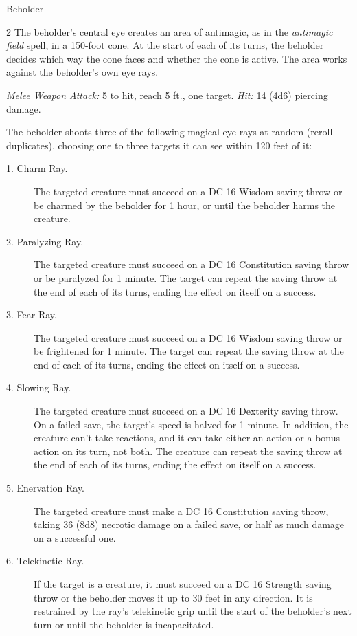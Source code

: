 \documentclass[10pt,a4paper,twoside,bg=print,twocolumn,openany,nodeprecatedcode]{dndbook}
\begin{document}
\begin{DndMonster}[float*=b,width=\textwidth + 8pt]{Beholder}
\begin{multicols}{2}
\DndMonsterBasics[
armor-class = {18 (natural armor)},
hit-points = {\DndDice{19d10 + 76}},
speed = {0 ft., fly 20 ft. \textit{(hover)}}
]
\DndMonsterAbilityScores[
 str = 10,
 dex = 14,
 con = 18,
 int = 17,
 wis = 15,
 cha = 17
]
\DndMonsterDetails[
saving-throws = {Int +8, Wis +7, Cha +8},
skills = {Perception +12},
condition-immunities = {prone},
senses = {darkvision 120 ft., passive perception 22},
languages = {Deep Speech, Undercommon},
challenge = 13,
]
The beholder's central eye creates an area of antimagic, as in the \textit{antimagic field} spell, in a 150-foot cone. At the start of each of its turns, the beholder decides which way the cone faces and whether the cone is active. The area works against the beholder's own eye rays.

\textsl{Melee Weapon Attack:} 5 to hit, reach 5 ft., one target. \textsl{Hit:} 14 (4d6) piercing damage.

The beholder shoots three of the following magical eye rays at random (reroll duplicates), choosing one to three targets it can see within 120 feet of it:


\begin{description}
\item[1. Charm Ray.]
The targeted creature must succeed on a DC 16 Wisdom saving throw or be charmed by the beholder for 1 hour, or until the beholder harms the creature.
\item[2. Paralyzing Ray.]
The targeted creature must succeed on a DC 16 Constitution saving throw or be paralyzed for 1 minute. The target can repeat the saving throw at the end of each of its turns, ending the effect on itself on a success.
\item[3. Fear Ray.]
The targeted creature must succeed on a DC 16 Wisdom saving throw or be frightened for 1 minute. The target can repeat the saving throw at the end of each of its turns, ending the effect on itself on a success.
\item[4. Slowing Ray.]
The targeted creature must succeed on a DC 16 Dexterity saving throw. On a failed save, the target's speed is halved for 1 minute. In addition, the creature can't take reactions, and it can take either an action or a bonus action on its turn, not both. The creature can repeat the saving throw at the end of each of its turns, ending the effect on itself on a success.
\item[5. Enervation Ray.]
The targeted creature must make a DC 16 Constitution saving throw, taking 36 (8d8) necrotic damage on a failed save, or half as much damage on a successful one.
\item[6. Telekinetic Ray.]
If the target is a creature, it must succeed on a DC 16 Strength saving throw or the beholder moves it up to 30 feet in any direction. It is restrained by the ray's telekinetic grip until the start of the beholder's next turn or until the beholder is incapacitated.


\end{description}
\end{multicols}
\end{DndMonster}
\end{document}
